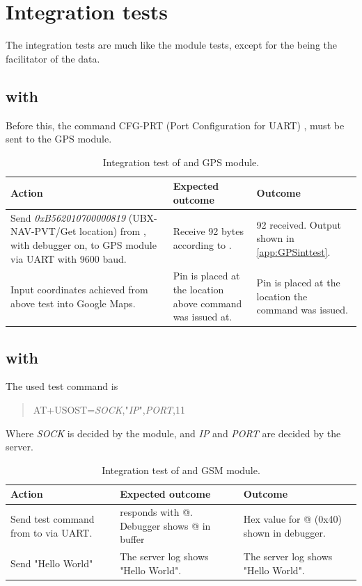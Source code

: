 \section{Integration tests}
The integration tests are much like the module tests, except for the \MKR being the facilitator of the data.

\subsection{\MKR with \GPS}
Before this, the command CFG-PRT (Port Configuration for UART) \cite[p.~119-120]{NEO7_proto}, must be sent to the GPS module.

\begin{table}[H]
	\centering
	\begin{tabularx}{\textwidth}{p{4.3cm} X X}
		\toprule
		\textbf{Action} & \textbf{Expected outcome} & \textbf{Outcome} \\
		\midrule
		Send \textit{0xB562010700000819} (UBX-NAV-PVT/Get location) from \MKR, with debugger on, to GPS module via UART with \num{9600} baud. & Receive \num{92} bytes according to \cite[p.~160-161]{NEO7_proto}. & \SI{92}{\byte} received. Output shown in \cref{app:GPSinttest}. \\
		Input coordinates achieved from above test into Google Maps. & Pin is placed at the location above command was issued at. & Pin is placed at the location the command was issued. \\
		\bottomrule
	\end{tabularx}
	\caption{Integration test of \MKR and \GPS GPS module.}
	\label{AT:intGPS}
\end{table}

\subsection{\MKR with \SARA}
The used test command is
\begin{quote}
	AT+USOST=\textit{SOCK},"\textit{IP}",\textit{PORT},11
\end{quote}
Where \textit{SOCK} is decided by the \SARA module, and \textit{IP} and \textit{PORT} are decided by the server.

\begin{table}[H]
	\centering
	\begin{tabularx}{\textwidth}{p{4.3cm} X X}
		\toprule
		\textbf{Action} & \textbf{Expected outcome} & \textbf{Outcome} \\
		\midrule
		Send test command from \MKR to \SARA via UART. &
		\SARA responds with @. Debugger shows @ in buffer & Hex value for @ (0x40) shown in debugger.\\
		Send "Hello World" & The server log shows "Hello World". & The server log shows "Hello World".\\
		\bottomrule
	\end{tabularx}
	\caption{Integration test of \MKR and \SARA GSM module.}
	\label{AT:intGSM}
\end{table}

